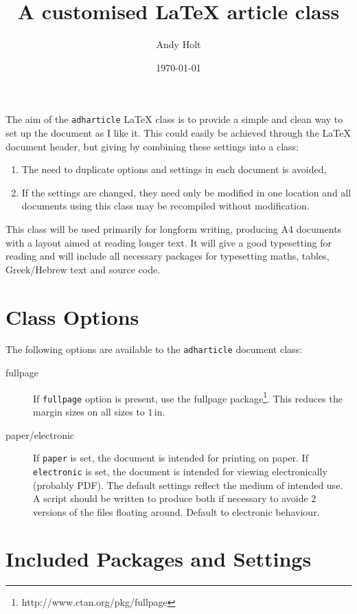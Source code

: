 \documentclass{adharticle}  %
\title{A customised \LaTeX{} article class}
\author{Andy Holt}
\date{\today}
\begin{document}
\maketitle

\noindent
The aim of the \texttt{adharticle} \LaTeX{} class is to provide a
simple and clean way to set up the document as I like it. This could easily be
achieved through the \LaTeX{} document header, but giving by combining these
settings into a class:
\begin{enumerate}
\item The need to duplicate options and settings in each document is avoided,
\item If the settings are changed, they need only be modified in one location
  and all documents using this class may be recompiled without modification.
\end{enumerate}

This class will be used primarily for longform writing, producing A4 documents
with a layout aimed at reading longer text. It will give a good typesetting for
reading and will include all necessary packages for typesetting maths, tables,
Greek/Hebrew text and source code.

\section{Class Options}

The following options are available to the \texttt{adharticle} document class:
\begin{description}
\item[fullpage] If \texttt{fullpage} option is present, use the fullpage
  package\footnote{http://www.ctan.org/pkg/fullpage}. This reduces the margin sizes on all sizes to $1\,\mathrm{in}$.
\item[paper/electronic] If \texttt{paper} is set, the document is intended for
  printing on paper. If \texttt{electronic} is set, the document is intended for
  viewing electronically (probably PDF). The default settings reflect the medium
  of intended use. A script should be written to produce both if necessary to
  avoide 2 versions of the files floating around. Default to electronic
  behaviour.
\end{description}


\section{Included Packages and Settings}
\end{document}
